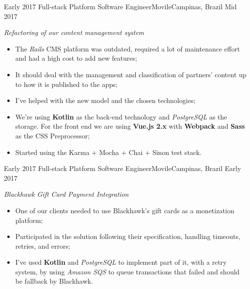 %
%
%


\begin{experiences}
  \experience
  {Early 2017} {Full-stack Platform Software Engineer}{Movile}{Campinas, Brazil}
  {Mid 2017}
        {
        \emph{Refactoring of our content management system}\\
          \begin{itemize}
            \item The \emph{Rails} CMS platform was outdated, required a lot of maintenance effort and had a high cost to add new features;
            \item It should deal with the management and classification of partners' content up to how it is published to the apps;
            \item I've helped with the new model and the chosen technologies;
            \item We're using \textbf{Kotlin} as the back-end technology and \emph{PostgreSQL} as the storage. For the front end we are using \textbf{Vue.js 2.x} with \textbf{Webpack} and \textbf{Sass} as the CSS Preprocessor;
            \item Started using the Karma + Mocha + Chai + Sinon test stack.\\
          \end{itemize}
        }{}
  \experience
  {Early 2017} {Full-stack Platform Software Engineer}{Movile}{Campinas, Brazil}
  {Early 2017}
        {
        \emph{Blackhawk Gift Card Payment Integration}\\
          \begin{itemize}
            \item One of our clients needed to use Blackhawk's gift cards as a monetization platform;
            \item Participated in the solution following their specification, handling timeouts, retries, and errors;
            \item I've used \textbf{Kotlin} and \emph{PostgreSQL} to implement part of it, with a retry system, by using \emph{Amazon SQS} to queue
            transactions that failed and should be fallback by Blackhawk.\\

\end{itemize}}
\end{experiences}
